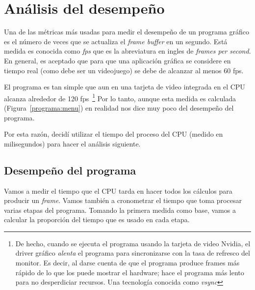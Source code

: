 \section{Análisis del desempeño}
\label{sec:performance}
Una de las métricas más usadas para medir el desempeño de un programa gráfico es el número de veces que se actualiza el \emph{\textenglish{frame buffer}} en un segundo.
Está medida es conocida como \emph{fps} que es la abreviatura en ingles de  \emph{\textenglish{frames per second}}.
En general, es aceptado que para que una aplicación gráfica se considere en tiempo real (como debe ser un videojuego) se debe de alcanzar al menos 60 fps.

El programa es tan simple que aun en una tarjeta de video integrada en el CPU alcanza alrededor de 120 fps~\footnote{De hecho, cuando se ejecuta el programa usando la tarjeta de video Nvidia, el driver gráfico \emph{alenta} el programa para sincronizarse con la tasa de refresco del monitor. Es decir, al darse cuenta de que el programa produce frames más rápido de lo que los puede mostrar el hardware; hace el programa más lento para no desperdiciar recursos. Una tecnología conocida como \emph{\textenglish{vsync}}}
Por lo tanto, aunque esta medida es calculada (Figura~\ref{programa:menu}) en realidad nos dice muy poco del desempeño del programa.

Por esta razón, decidí utilizar el tiempo del proceso del CPU (medido en milisegundos) para hacer el análisis siguiente.

\subsection{Desempeño del programa}

Vamos a medir el tiempo que el CPU tarda en hacer todos los cálculos para producir un \emph{\textenglish{frame}}.
Vamos también a cronometrar el tiempo que toma procesar varias etapas del programa.
Tomando la primera medida como base, vamos a calcular la proporción del tiempo que es usado en cada etapa.

